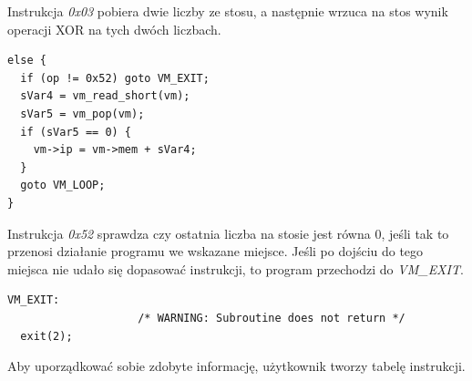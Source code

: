 \documentclass[language=polish,type=eng]{aghmodern}
\begin{document}
\begin{appendices}
Instrukcja \emph{0x03} pobiera dwie liczby ze stosu, a następnie wrzuca na stos wynik operacji
XOR na tych dwóch liczbach.

\begin{verbatim}
else {
  if (op != 0x52) goto VM_EXIT;
  sVar4 = vm_read_short(vm);
  sVar5 = vm_pop(vm);
  if (sVar5 == 0) {
    vm->ip = vm->mem + sVar4;
  }
  goto VM_LOOP;
}
\end{verbatim}

Instrukcja \emph{0x52} sprawdza czy ostatnia liczba na stosie jest równa 0, jeśli tak
to przenosi działanie programu we wskazane miejsce. Jeśli po dojściu do tego miejsca
nie udało się dopasować instrukcji, to program przechodzi do \emph{VM\_EXIT}.

\begin{verbatim}
VM_EXIT:
                    /* WARNING: Subroutine does not return */
  exit(2);
\end{verbatim}

Aby uporządkować sobie zdobyte informację, użytkownik tworzy tabelę instrukcji.

\begin{table}[H]
\caption{Tabela instrukcji maszyny wirtualnej}
\end{table}


\end{appendices}
\end{document}
